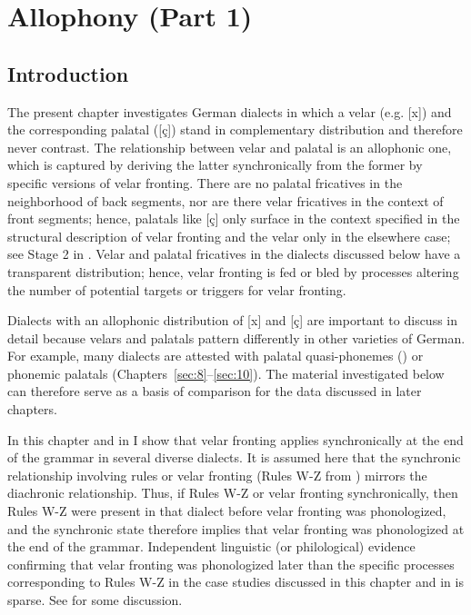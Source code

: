 \chapter{Allophony (Part 1)}\label{sec:3}


\section{Introduction}\label{sec:3.1}

The present chapter investigates German dialects in which a velar (e.g. [x]) and the corresponding palatal ([ç]) stand in complementary distribution and therefore never contrast. The relationship between velar and palatal is an allophonic one, which is captured by deriving the latter synchronically from the former by specific versions of velar fronting. There are no palatal fricatives in the neighborhood of back segments, nor are there velar fricatives in the context of front segments; hence, palatals like [ç] only surface in the context specified in the structural description of velar fronting and the velar only in the elsewhere case; see Stage 2 in . Velar and palatal fricatives in the dialects discussed below have a transparent distribution; hence, velar fronting is fed or bled by processes altering the number of potential targets or triggers for velar fronting.

Dialects with an allophonic distribution of [x] and [ç] are important to discuss in detail because velars and palatals pattern differently in other varieties of German. For example, many dialects are attested with palatal quasi-phonemes () or phonemic palatals (Chapters~\ref{sec:8}--\ref{sec:10}). The material investigated below can therefore serve as a basis of comparison for the data discussed in later chapters.

In this chapter and in  I show that velar fronting applies synchronically at the end of the grammar in several diverse dialects. It is assumed here that the synchronic relationship involving rules  or  velar fronting (Rules W-Z from ) mirrors the diachronic relationship. Thus, if Rules W-Z  or  velar fronting synchronically, then Rules W-Z were present in that dialect before velar fronting was phonologized, and the synchronic state therefore implies that velar fronting was phonologized at the end of the grammar. Independent linguistic (or philological) evidence confirming that velar fronting was phonologized later than the specific processes corresponding to Rules W-Z in the case studies discussed in this chapter and in  is sparse. See  for some discussion.

